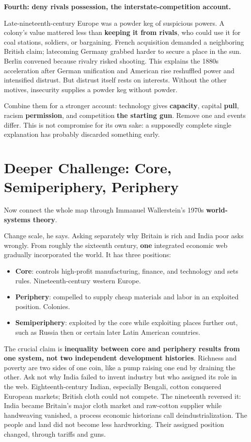 \textbf{Fourth: deny rivals possession, the interstate-competition account.}

Late-nineteenth-century Europe was a powder keg of suspicious powers. A colony's value mattered less than \textbf{keeping it from rivals}, who could use it for coal stations, soldiers, or bargaining. French acquisition demanded a neighboring British claim; latecoming Germany grabbed harder to secure a place in the sun. Berlin convened because rivalry risked shooting. This explains the 1880s acceleration after German unification and American rise reshuffled power and intensified distrust. But distrust itself rests on interests. Without the other motives, insecurity supplies a powder keg without powder.

Combine them for a stronger account: technology gives \textbf{capacity}, capital \textbf{pull}, racism \textbf{permission}, and competition \textbf{the starting gun}. Remove one and events differ. This is not compromise for its own sake: a supposedly complete single explanation has probably discarded something early.

\section{Deeper Challenge: Core, Semiperiphery, Periphery}
Now connect the whole map through Immanuel Wallerstein's 1970s \textbf{world-systems theory}.

Change scale, he says. Asking separately why Britain is rich and India poor asks wrongly. From roughly the sixteenth century, \textbf{one} integrated economic web gradually incorporated the world. It has three positions:

\begin{itemize}
\item \textbf{Core}: controls high-profit manufacturing, finance, and technology and sets rules. Nineteenth-century western Europe.
\item \textbf{Periphery}: compelled to supply cheap materials and labor in an exploited position. Colonies.
\item \textbf{Semiperiphery}: exploited by the core while exploiting places further out, such as Russia then or certain later Latin American countries.
\end{itemize}
The crucial claim is \textbf{inequality between core and periphery results from one system, not two independent development histories}. Richness and poverty are two sides of one coin, like a pump raising one end by draining the other. Ask not why India failed to invent industry but who assigned its role in the web. Eighteenth-century Indian, especially Bengali, cotton conquered European markets; British cloth could not compete. The nineteenth reversed it: India became Britain's major cloth market and raw-cotton supplier while handweaving vanished, a process economic historians call deindustrialization. The people and land did not become less hardworking. Their assigned position changed, through tariffs and guns.

